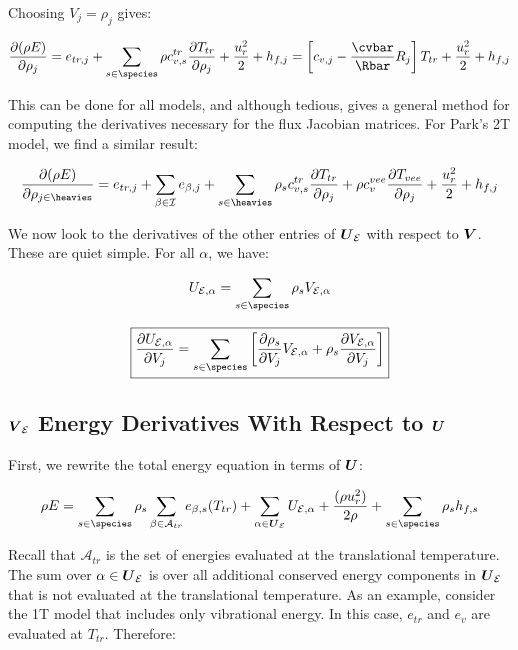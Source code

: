 \documentclass[10pt]{article}
\begin{document}
\begin{flushleft}
Choosing $V_j = \rho_j$ gives:

\begin{equation*}
    \pd{(\rho E)}{\rho_j} = e_{tr,j} + \sum_{s \in \species} \rho c_{v,s}^{tr} \pd{T_{tr}}{\rho_j} + \frac{u_r^2}{2} + h_{f,j} = \bb{c_{v,j} - \frac{\cvbar}{\Rbar} R_j} T_{tr} + \frac{u_r^2}{2} + h_{f,j}
\end{equation*}

 This can be done for all models, and although tedious, gives a general method for computing the derivatives necessary for the flux Jacobian matrices. For Park's 2T model, we find a similar result:

\begin{equation*}
    \pd{(\rho E)}{\rho_{j \in \heavies}} = e_{tr,j} + \sum_{\beta \in \mathcal{I}} e_{\beta,j} + \sum_{s \in \heavies} \rho_s c_{v,s}^{tr} \pd{T_{tr}}{\rho_j} + \rho c_v^{vee} \pd{T_{vee}}{\rho_j} + \frac{u_r^2}{2} + h_{f,j} 
\end{equation*}

We now look to the derivatives of the other entries of $\boldsymbol{U}_{\mathcal{E}}$ with respect to $\boldsymbol{V}$. These are quiet simple. For all $\alpha$, we have:

\begin{equation*}
    U_{\mathcal{E}, \alpha} = \sum_{s \in \species} \rho_s V_{\mathcal{E}, \alpha}
\end{equation*}

\begin{equation*}
    \boxed{\pd{U_{\mathcal{E}, \alpha}}{V_j} = \sum_{s \in \species} \bb{\pd{\rho_s}{V_j} V_{\mathcal{E}, \alpha} + \rho_s \pd{V_{\mathcal{E}, \alpha}}{V_j} }}
\end{equation*}

\subsection{$\boldsymbol{V}_{\mathcal{E}}$ Energy Derivatives With Respect to $\boldsymbol{U}$}

First, we rewrite the total energy equation in terms of $\boldsymbol{U}$:

\begin{equation}
\rho E = \sum_{s \in \species} \rho_s \sum_{\beta \in \mathcal{A}_{tr}} e_{\beta,s} (T_{tr}) + \sum_{\alpha \in \bigU_{\mathcal{E}}} U_{\mathcal{E},\alpha} + \frac{(\rho u_r^2)}{2 \rho} + \sum_{s \in \species} \rho_s h_{f,s}
\end{equation}

Recall that $\mathcal{A}_{tr}$ is the set of energies evaluated at the translational temperature. The sum over $\alpha \in \boldsymbol{U}_{\mathcal{E}}$ is over all additional conserved energy components in $\boldsymbol{U}_{\mathcal{E}}$ that is not evaluated at the translational temperature. As an example, consider the 1T model that includes only vibrational energy. In this case, $e_{tr}$ and $e_{v}$ are evaluated at $T_{tr}$. Therefore:


\end{flushleft}
\end{document}
